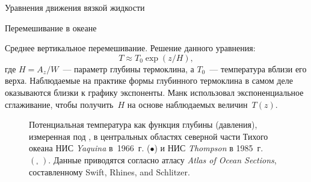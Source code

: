 \begin{chapter}{Уравнения движения вязкой жидкости}
\begin{section}{Перемешивание в океане}
\begin{paragraph}{Среднее вертикальное перемешивание.}
Решение данного уравнения:
\begin{equation}
 T \approx T_0 \exp (z/H),
\end{equation}
где $H=A_z/W$~--- параметр глубины термоклина, 
а $T_0$~--- температура вблизи его верха. Наблюдаемые на практике формы
глубинного термоклина в самом деле оказываются близки к графику экспоненты. 
Манк использовал экспоненциальное сглаживание, чтобы получить~$H$ на основе 
наблюдаемых величин~$T(z)$.
%

\begin{figure}[t!]
\caption{Потенциальная температура как функция глубины (давления),
измеренная под ,  
в центральных областях северной части Тихого океана 
НИС \emph{Yaquina} в~1966~г. ($\bullet$) и НИС
\emph{Thompson} в 1985~г.\ $\left( _\square \;\right)$. 
Данные приводятся согласно атласу \emph{Atlas of Ocean Sections}, 
составленному Swift, Rhines, and Schlitzer.}
\label{fig:mixing}
\end{figure}
%


\end{paragraph}
\end{section}
\end{chapter}
